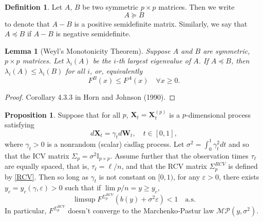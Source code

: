 \documentclass[a4paper,11pt]{article}
\theoremstyle{plain}
\newtheorem{lmm}[thm]{Lemma}
\theoremstyle{definition}
\newtheorem{defn}[thm]{Definition}
\newtheorem{prps}[thm]{Proposition}
\begin{document}
	\begin{defn}
		Let $A$, $B$ be two symmetric $p \times p$ matrices. Then we write
		\[ A \succeq B\]
		to denote that $A-B$ is a positive semidefinite matrix. Similarly, we say that $A \preceq B$ if $A-B$ is negative semidefinite.
	\end{defn}
	
	\begin{lmm}[Weyl's Monotonicity Theorem]
		Suppose $A$ and $B$ are symmetric, $p \times p$ matrices. Let $\lambda_i(A)$ be the $i$-th largest eigenvalue of $A$. If $A \preceq B$, then $\lambda_i(A) \leq \lambda_i(B)$ for all $i$, or, equivalently
		\[ F^B(x) \leq F^A(x) \quad \forall x \geq 0. \]
    \end{lmm}
    \begin{proof}
    	Corollary 4.3.3 in Horn and Johnson (1990).
    \end{proof}
		
	\begin{prps} \label{counter RCV}
		Suppose that for all $p$, $\mathbf{X}_t=\mathbf{X}_t^{(p)}$ is a $p$-dimensional process satisfying
		\begin{equation}
		d \mathbf{X}_t = \gamma_t d\mathbf{W}_t, \quad t \in [0, 1],
		\end{equation}
		where $\gamma_t > 0$ is a nonrandom (scalar) c$\grave{\text{a}}$dl$\grave{\text{a}}$g process. Let $\sigma^2 = \int_0^1 \gamma_t^2 dt$ and so that the ICV matrix $\Sigma_p = \sigma^2 \mathbb{I}_{p \times p}$. Assume further that the observation times $\tau_{\ell}$ are equally spaced, that is, $\tau_{\ell} = \ell / n$, and that the RCV matrix $\Sigma_p^{RCV}$ is defined by \eqref{RCV}. Then so long as $\gamma_t$ is not constant on $[0, 1)$, for any $\varepsilon > 0$, there exists $y_c = y_c(\gamma, \varepsilon) > 0$ such that if $\lim p/n = y \geq y_c$,
		\begin{equation}
			\limsup F^{\Sigma_p^{RCV}}(b(y)+\sigma^2\varepsilon) < 1 \quad \text{a.s.}
		\end{equation}
		In particular, $F^{\Sigma_p^{RCV}}$ doesn't converge to the Marchenko-Pastur law $\mathcal{MP}(y, \sigma^2)$.
    \end{prps}
    
\end{document}
